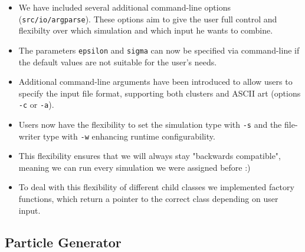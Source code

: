 \documentclass{article}
\begin{document}
\begin{itemize}
    \item We have included several additional command-line options (\verb|src/io/argparse|). These options aim to give the user full control and flexibilty over which simulation and which input he wants to combine.
    \item The parameters \texttt{epsilon} and \texttt{sigma} can now be specified via command-line if the default values are not suitable for the user's needs.
    \item Additional command-line arguments have been introduced to allow users to specify the input file format, supporting both clusters and ASCII art (options \texttt{-c} or \texttt{-a}).
    \item Users now have the flexibility to set the simulation type with \texttt{-s} and the file-writer type with \texttt{-w} enhancing runtime configurability.
    \item This flexibility ensures that we will always stay "backwards compatible", meaning we can run every simulation we were assigned before :)
    \item To deal with this flexibility of different child classes we implemented factory functions, which return a pointer to the correct class depending on user input.
\end{itemize}

\subsection{Particle Generator}
\label{subsec:particleGenerator}
\end{document}
